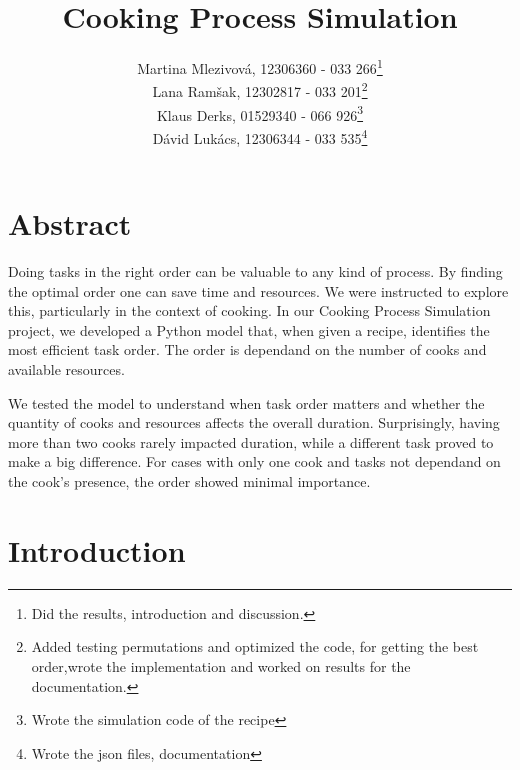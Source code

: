 \documentclass[a4paper,11pt]{scrartcl}
\begin{document}
\subject{Modeling and Simulation}
\title{Cooking Process Simulation}

\publishers{Supervisor: Martin Bicher}
\author{Martina Mlezivová, 12306360 - 033 266\footnote{Did the results, introduction and discussion.}\\ %
Lana Ramšak, 12302817 - 033 201\footnote{Added testing permutations and optimized the code, for getting the best order,wrote the implementation and worked on results for the documentation.} \\       %
Klaus Derks, 01529340 - 066 926\footnote{Wrote the simulation code of the recipe} \\ %
Dávid Lukács, 12306344 - 033 535\footnote{Wrote the json files, documentation}} %
\maketitle

\section*{Abstract}

Doing tasks in the right order can be valuable to any kind of process. 
By finding the optimal order one can save time and resources. We were instructed to explore this, particularly in the context of cooking. 
In our Cooking Process Simulation project, we developed a Python model that, when given a recipe, identifies the most efficient task order.
The order is dependand on the number of cooks and available resources.

We tested the model to understand when task order matters and whether 
the quantity of cooks and resources affects the overall duration. Surprisingly, having more than two cooks rarely impacted duration, while a 
different task proved to make a big difference. For cases with only one cook and tasks not dependand on the cook's presence, the order showed minimal importance.

\newpage

\tableofcontents

\newpage

\section{Introduction}


\end{document}
